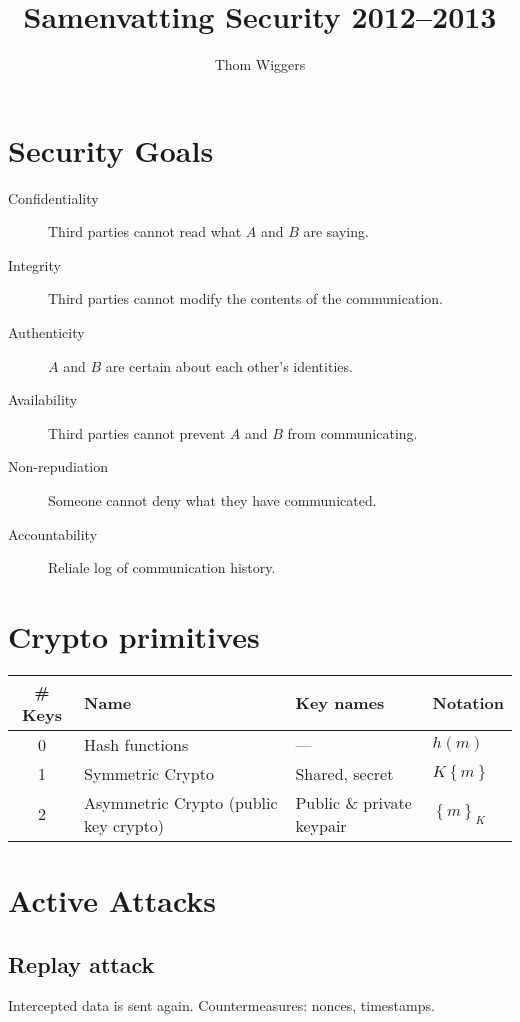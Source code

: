 \documentclass{article}
\author{Thom Wiggers}
\title{Samenvatting Security 2012--2013}
\begin{document}
\maketitle
\section{Security Goals}


\begin{description}
  \item[Confidentiality] Third parties cannot read what $A$ and $B$ are saying.
  \item[Integrity] Third parties cannot modify the contents of the communication.
  \item[Authenticity] $A$ and $B$ are certain about each other's identities.
  \item[Availability] Third parties cannot prevent $A$ and $B$ from communicating.
  \item[Non-repudiation] Someone cannot deny what they have communicated.
  \item[Accountability] Reliale log of communication history.
\end{description}

\section{Crypto primitives}

\begin{tabular}[h]{c||p{100pt}|l|l}
  \bf \# Keys & \bf Name & \bf Key names & \bf Notation \\ \hline \hline
  0 & Hash functions & --- & $h(m)$ \\ \hline
  1 & Symmetric Crypto & Shared, secret & $K\left\{ m \right\}$  \\\hline
  2 & Asymmetric Crypto (public key crypto) & Public \& private keypair & $\left\{ m \right\}_K$ \\
\end{tabular}

\section{Active Attacks}

\subsection{Replay attack}

Intercepted data is sent again. Countermeasures: nonces, timestamps.
\end{document}
